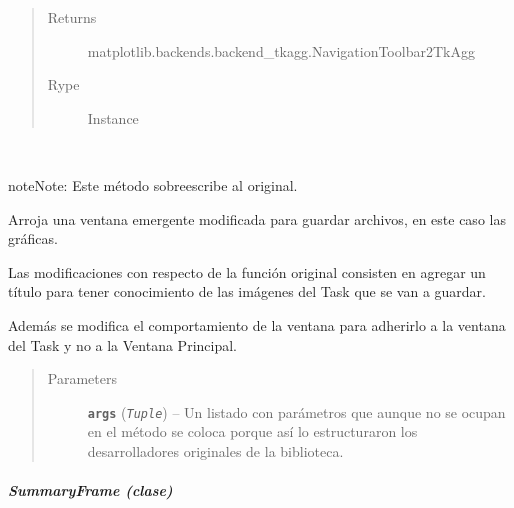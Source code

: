 \documentclass[letterpaper,10pt,english]{sphinxmanual}
\begin{document}
\begin{fulllineitems}
\begin{quote}
\begin{description}
\begin{itemize}
\end{itemize}

\item[{Returns}] \leavevmode
matplotlib.backends.backend\_tkagg.NavigationToolbar2TkAgg

\item[{Rype}] \leavevmode
Instance

\end{description}\end{quote}

\begin{fulllineitems}
\label{View/Additional/ResultsGrapher/CustomNavigationToolbar2TkAgg:View.Additional.ResultsGrapher.CustomNavigationToolbar2TkAgg.CustomNavigationToolbar2TkAgg.save_figure}~
\begin{notice}{note}{Note:}
Este método sobreescribe al original.
\end{notice}

\begin{DUlineblock}{0em}
\item[] Arroja una ventana emergente modificada para guardar archivos, en este caso
las gráficas.
\item[] Las modificaciones con respecto de la función original consisten en agregar
un título para tener conocimiento de las imágenes del Task que se van a guardar.
\item[] Además se modifica el comportamiento de la ventana para adherirlo a la ventana
del Task y no a la Ventana Principal.
\end{DUlineblock}
\begin{quote}\begin{description}
\item[{Parameters}] \leavevmode
\textbf{\texttt{args}} (\emph{\texttt{Tuple}}) -- Un listado con parámetros que aunque no se ocupan en el método
se coloca porque así lo estructuraron los desarrolladores originales
de la biblioteca.

\end{description}\end{quote}

\end{fulllineitems}


\end{fulllineitems}



\subparagraph{SummaryFrame (clase)}
\label{View/Additional/ResultsGrapher/SummaryFrame:summaryframe-clase}\label{View/Additional/ResultsGrapher/SummaryFrame:module-View.Additional.ResultsGrapher.SummaryFrame}\label{View/Additional/ResultsGrapher/SummaryFrame::doc}
\end{document}
